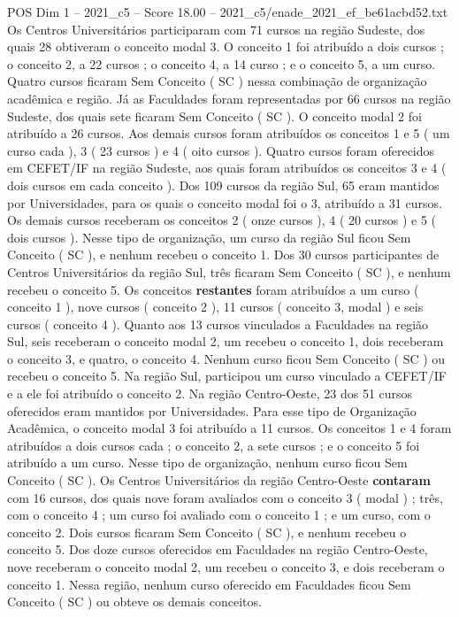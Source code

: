 \begin{textsample}{POS Dim 1 – 2021\_c5 – Score 18.00 – 2021\_c5/enade\_2021\_ef\_be61acbd52.txt}
Os Centros Universitários participaram com 71 cursos na região Sudeste, dos quais 28 obtiveram o conceito modal 3.
O conceito 1 foi atribuído a dois cursos ; o conceito 2, a 22 cursos ; o conceito 4, a 14 curso ; e o conceito 5, a um curso.
Quatro cursos ficaram Sem Conceito ( SC ) nessa combinação de organização acadêmica e região.
Já as Faculdades foram representadas por 66 cursos na região Sudeste, dos quais sete ficaram Sem Conceito ( SC ).
O conceito modal 2 foi atribuído a 26 cursos.
Aos demais cursos foram atribuídos os conceitos 1 e 5 ( um curso cada ), 3 ( 23 cursos ) e 4 ( oito cursos ).
Quatro cursos foram oferecidos em CEFET/IF na região Sudeste, aos quais foram atribuídos os conceitos 3 e 4 ( dois cursos em cada conceito ).
Dos 109 cursos da região Sul, 65 eram mantidos por Universidades, para os quais o conceito modal foi o 3, atribuído a 31 cursos.
Os demais cursos receberam os conceitos 2 ( onze cursos ), 4 ( 20 cursos ) e 5 ( dois cursos ).
Nesse tipo de organização, um curso da região Sul ficou Sem Conceito ( SC ), e nenhum recebeu o conceito 1.
Dos 30 cursos participantes de Centros Universitários da região Sul, três ficaram Sem Conceito ( SC ), e nenhum recebeu o conceito 5.
Os conceitos \textbf{restantes} foram atribuídos a um curso ( conceito 1 ), nove cursos ( conceito 2 ), 11 cursos ( conceito 3, modal ) e seis cursos ( conceito 4 ).
Quanto aos 13 cursos vinculados a Faculdades na região Sul, seis receberam o conceito modal 2, um recebeu o conceito 1, dois receberam o conceito 3, e quatro, o conceito 4.
Nenhum curso ficou Sem Conceito ( SC ) ou recebeu o conceito 5.
Na região Sul, participou um curso vinculado a CEFET/IF e a ele foi atribuído o conceito 2.
Na região Centro-Oeste, 23 dos 51 cursos oferecidos eram mantidos por Universidades.
Para esse tipo de Organização Acadêmica, o conceito modal 3 foi atribuído a 11 cursos.
Os conceitos 1 e 4 foram atribuídos a dois cursos cada ; o conceito 2, a sete cursos ; e o conceito 5 foi atribuído a um curso.
Nesse tipo de organização, nenhum curso ficou Sem Conceito ( SC ).
Os Centros Universitários da região Centro-Oeste \textbf{contaram} com 16 cursos, dos quais nove foram avaliados com o conceito 3 ( modal ) ; três, com o conceito 4 ; um curso foi avaliado com o conceito 1 ; e um curso, com o conceito 2.
Dois cursos ficaram Sem Conceito ( SC ), e nenhum recebeu o conceito 5.
Dos doze cursos oferecidos em Faculdades na região Centro-Oeste, nove receberam o conceito modal 2, um recebeu o conceito 3, e dois receberam o conceito 1.
Nessa região, nenhum curso oferecido em Faculdades ficou Sem Conceito ( SC ) ou obteve os demais conceitos.

\end{textsample}
